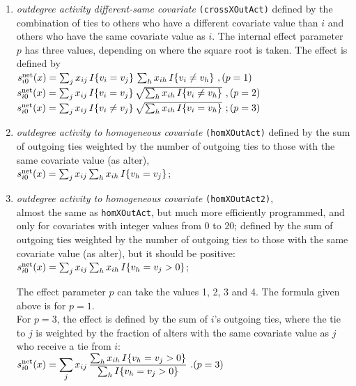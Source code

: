 \documentclass[a4paper,fleqn,11pt]{article}
\newcommand{\+}{\, + \,}
\newcommand{\vit}{\theenumi}
\begin{document}
\begin{enumerate}
 \item {\em outdegree activity different-same covariate}
\texttt{(crossXOutAct)} defined by the
  combination of ties to others who have a different covariate value than $i$
  and others who have the same covariate value as $i$.
  The internal effect parameter $p$ has three values,
  depending on where the square root is taken.
  The effect is defined by \\
 $s^{\rm net}_{i\vit}(x) =  \sum_j x_{ij} \, I\{v_i = v_j \} \,
             \sum_h x_{ih}\, I\{v_i \neq v_h \} \ , \hfill (p=1) $\\[0.4em]
 $s^{\rm net}_{i\vit}(x) =  \sum_j x_{ij} \, I\{v_i = v_j \} \,
            \sqrt{ \sum_h x_{ih}\, I\{v_i \neq v_h \} } \ ,  \hfill (p=2)$\\[0.4em]
 $s^{\rm net}_{i\vit}(x) =  \sum_j x_{ij} \, I\{v_i \neq v_j \} \,
            \sqrt{ \sum_h x_{ih}\, I\{v_i = v_h \} }  \ ;  \hfill (p=3)$\\


 \item {\em outdegree activity to homogeneous covariate}
\texttt{(homXOutAct)} defined by the
 sum of outgoing ties weighted by the number of outgoing
 ties to those with the same covariate value (as alter),\\
 $s^{\rm net}_{i\vit}(x) = \sum_j x_{ij} \sum_h x_{ih} \,I\{v_h = v_j \} $;


 \item {\em outdegree activity to homogeneous covariate}
\texttt{(homXOutAct2)},\\
 almost the same as \texttt{homXOutAct}, but much more efficiently programmed,
 and only for covariates with integer values from 0 to 20; defined by the
 sum of outgoing ties weighted by the number of outgoing
 ties to those with the same covariate value (as alter),
 but it should be positive:\\
 $s^{\rm net}_{i\vit}(x) = \sum_j x_{ij} \sum_h x_{ih} \,I\{v_h = v_j > 0\} $;

 The effect parameter $p$ can take the values 1, 2, 3 and 4.
 The formula given above is for $p=1$.\\
 For $p=3$, the effect is defined by the
  sum of $i$'s outgoing ties, where the tie to $j$ is weighted by
the fraction of alters with the same covariate value as $j$ who receive a tie from $i$: \\[0.5em]
 $\displaystyle s^{\rm net}_{i\vit}(x) =   \sum_j x_{ij}\, \frac{ \sum_{h} x_{ih}\, I\{v_h = v_j > 0 \}}
            { \sum_{h} I\{v_h = v_j > 0 \}} \ . \hfill (p=3) $


\end{enumerate}
\end{document}
